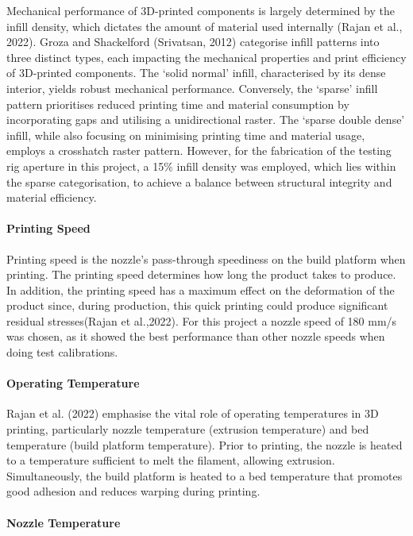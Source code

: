Mechanical performance of 3D-printed components is largely determined by the infill density, which dictates the amount of material used internally (Rajan et al., 2022).
Groza and Shackelford (Srivatsan, 2012) categorise infill patterns into three distinct types, each impacting the mechanical properties and print efficiency of 3D-printed components. 
The `solid normal' infill, characterised by its dense interior, yields robust mechanical performance. 
Conversely, the `sparse' infill pattern prioritises reduced printing time and material consumption by incorporating gaps and utilising a unidirectional raster. 
The `sparse double dense' infill, while also focusing on minimising printing time and material usage, employs a crosshatch raster pattern. 
However, for the fabrication of the testing rig aperture in this project, a 15\% infill density was employed, which lies within the sparse categorisation, to achieve a balance between structural integrity and material efficiency.

 \paragraph{Printing Speed}

 Printing speed is the nozzle's pass-through speediness on the build platform when printing. 
 The printing speed determines how long the product takes to produce. 
 In addition, the printing speed has a maximum effect on the deformation of the product since, during production, this quick printing could produce significant residual stresses(Rajan et al.,2022). 
 For this project a nozzle speed of 180 mm/s was chosen, as it showed the best performance than other nozzle speeds when doing test calibrations. 

\paragraph{Operating Temperature}

Rajan et al. (2022) emphasise the vital role of operating temperatures in 3D printing, particularly nozzle temperature (extrusion temperature) and bed temperature (build platform temperature). 
Prior to printing, the nozzle is heated to a temperature sufficient to melt the filament, allowing extrusion. 
Simultaneously, the build platform is heated to a bed temperature that promotes good adhesion and reduces warping during printing.

\paragraph{Nozzle Temperature}

